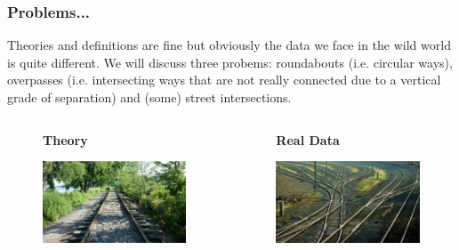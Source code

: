 \documentclass[c,10pt,pdftex]{beamer}
\begin{document}
\begin{frame}
  \frametitle{Problems...}
  \vspace{-0.5cm}
  Theories and definitions are fine but obviously the data we face in the wild world is quite different. We will discuss three probems: \alert{roundabouts} (i.e. circular ways), \alert{overpasses} (i.e. intersecting ways that are not really connected due to a vertical grade of separation) and (some) \alert{street intersections}.  
  \begin{columns}
  	\begin{column}{0.5\linewidth}
  		\begin{figure}
  			\centering
  			\Large \textbf{Theory} \par \medskip
  			\includegraphics[width = \linewidth]{images/theory.png}
  		\end{figure}
  	\end{column}
  	\begin{column}{0.5\linewidth}
  		\begin{figure}
  			\centering
  			\Large \textbf{Real Data} \par \medskip
  			\includegraphics[width = \linewidth]{images/real_data.png}
  		\end{figure}
  	\end{column}
  \end{columns}
\end{frame}
\end{document}
